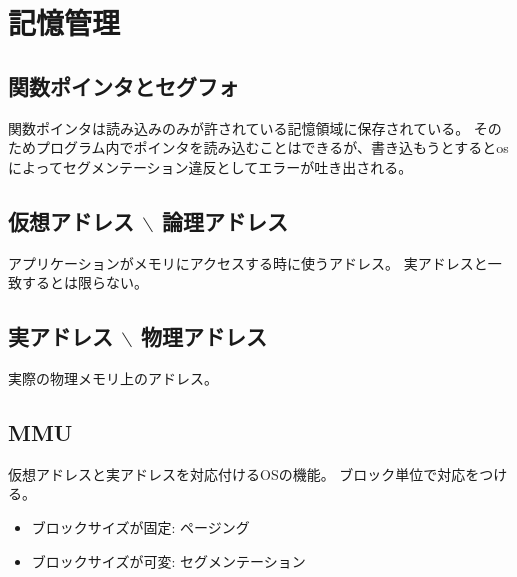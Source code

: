\section{記憶管理}
\subsection*{関数ポインタとセグフォ}
関数ポインタは読み込みのみが許されている記憶領域に保存されている。
そのためプログラム内でポインタを読み込むことはできるが、書き込もうとするとosによってセグメンテーション違反としてエラーが吐き出される。
\subsection*{仮想アドレス \(\backslash\) 論理アドレス}
アプリケーションがメモリにアクセスする時に使うアドレス。
実アドレスと一致するとは限らない。

\subsection*{実アドレス \(\backslash\) 物理アドレス}
実際の物理メモリ上のアドレス。

\subsection*{MMU}
仮想アドレスと実アドレスを対応付けるOSの機能。
ブロック単位で対応をつける。
\begin{itemize}
    \item ブロックサイズが固定: ページング
    \item ブロックサイズが可変: セグメンテーション
\end{itemize}